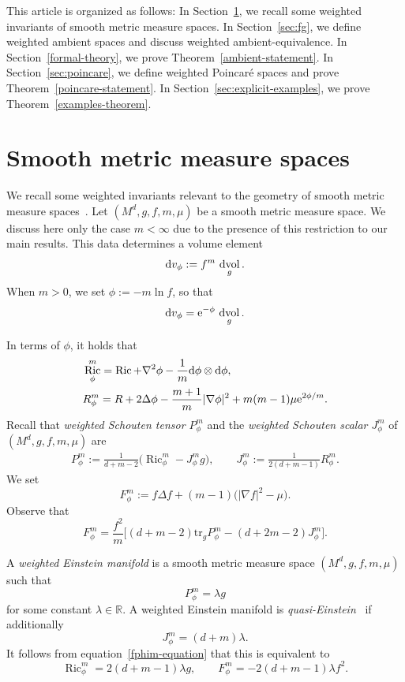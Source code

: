 \documentclass[pdftex]{sigma}
\DeclareMathOperator{\dvol}{dvol}
\DeclareMathOperator{\Ric}{Ric}
\newcommand{\lv}{\lvert}
\newcommand{\rv}{\rvert}
\newcommand{\bR}{\mathbb{R}}
\numberwithin{equation}{section}
\begin{document}
This article is organized as follows: In Section~\ref{sec:bg.tex}, we recall some weighted invariants of smooth metric measure spaces. In Section~\ref{sec:fg}, we define weighted ambient spaces and discuss weighted ambient-equivalence. In Section~\ref{formal-theory}, we prove Theorem~\ref{ambient-statement}. In Section~\ref{sec:poincare}, we define weighted Poincar\'e spaces and prove Theorem~\ref{poincare-statement}. In Section~\ref{sec:explicit-examples}, we prove Theorem~\ref{examples-theorem}.

\section{Smooth metric measure spaces}
\label{sec:bg.tex}

We recall some weighted invariants relevant to the geometry of smooth metric measure spaces~\cite{Case2014s}. Let $(M^d,g,f,m,\mu)$ be a smooth metric measure space. We discuss here only the case $m<\infty$ due to the presence of this restriction to our main results. This data determines a volume element
\[
{\rm d}v_\phi := f^m\,\dvol_g .
\]
When $m>0$, we set $\phi:=-m\ln f$, so that
\[
{\rm d}v_\phi = {\rm e}^{-\phi}\,\dvol_g .
\]


In terms of $\phi$, it holds that
\begin{align*}
&\Ric_\phi^m= \Ric + \nabla^2\phi - \frac{1}{m} {\rm d}\phi \otimes {\rm d}\phi,
\\
&R_\phi^m= R + 2\Delta\phi - \frac{m+1}{m}\lv\nabla\phi\rv^2 + m(m-1)\mu {\rm e}^{2\phi/m} .
\end{align*}
Recall that \emph{weighted Schouten tensor $P_\phi^m$} and the \emph{weighted Schouten scalar $J_\phi^m$} of $(M^d,g,f,m,\mu)$ are
\begin{gather*}
 P_\phi^m := \frac{1}{d+m-2}\big(\Ric_\phi^m - J_\phi^m g\big), \qquad
 J_\phi^m := \frac{1}{2(d+m-1)}R_\phi^m .
\end{gather*}
We set
\[
F_\phi^m:= f\Delta f+(m-1)\big(|\nabla f|^2-\mu\big).
\]
Observe that
\begin{equation}\label{fphim-equation}
F_\phi^m=\frac{f^2}{m}\bigl[(d+m-2)\mathrm{tr}_g P_\phi^m -(d+2m-2)J_\phi^m\bigr].
\end{equation}

A \emph{weighted Einstein manifold} is a smooth metric measure space $(M^d,g,f,m,\mu)$ such that
\[
P_\phi^m = \lambda g
\]
for some constant $\lambda\in\bR$.
A weighted Einstein manifold is \emph{quasi-Einstein}~\cite{Case_Shu_Wei} if additionally
\[
J_\phi^m=(d+m)\lambda.
\]
It follows from equation~\eqref{fphim-equation} that this is equivalent to
\[
\Ric_\phi^m=2(d+m-1)\lambda g,\qquad F_\phi^m=-2(d+m-1)\lambda f^2.
\]
\end{document}
